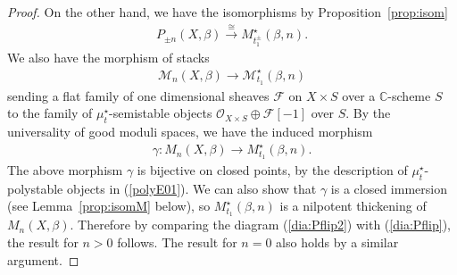 \documentclass[11pt]{amsart}
\theoremstyle{plain}
\theoremstyle{definition}
\theoremstyle{remark}
\newcommand{\fF}{\mathcal{F}}
\newcommand{\mM}{\mathcal{M}}
\newcommand{\oO}{\mathcal{O}}
\begin{document}
\begin{proof}
On the other hand, we have 
the isomorphisms 
by Proposition~\ref{prop:isom}
\begin{align*}
P_{\pm n}(X, \beta) \stackrel{\cong}{\to}
M_{t_1^{\pm}}^{\star}(\beta, n). 
\end{align*}
We also have
the morphism of stacks
\begin{align*}
\mM_n(X, \beta) \to \mM_{t_1}^{\star}(\beta, n)
\end{align*}
sending a flat family
of one dimensional sheaves $\fF$ on $X \times S$
over a $\mathbb{C}$-scheme $S$ to 
the family of $\mu_t^{\star}$-semistable objects
$\oO_{X \times S} \oplus \fF[-1]$ over $S$. 
By the universality of good moduli spaces, we have the induced 
morphism
\begin{align}\label{induced:M}
\gamma \colon 
M_n(X, \beta) \to M_{t_1}^{\star}(\beta, n). 
\end{align}
The above morphism $\gamma$ is bijective on closed points, 
by the description of $\mu_t^{\star}$-polystable objects
in (\ref{polyE01}). 
We can also show that $\gamma$ is 
a closed immersion (see Lemma~\ref{prop:isomM} below), 
so $M_{t_1}^{\star}(\beta, n)$ is a nilpotent thickening 
of $M_n(X, \beta)$. 
Therefore 
by comparing the diagram (\ref{dia:Pflip2})
with (\ref{dia:Pflip}), 
the result for $n>0$ follows. 
The result for $n=0$ also holds by
a similar argument.  
\end{proof}
\end{document}
